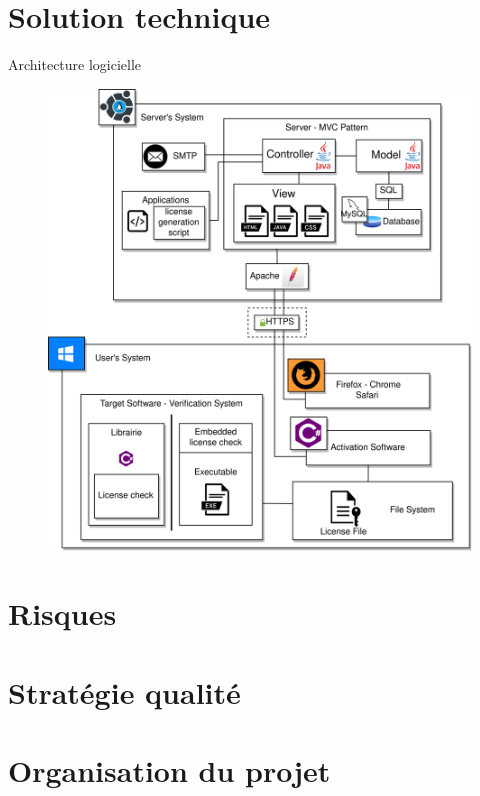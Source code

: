 \documentclass{cubeamer}
\begin{document}
\section{Solution technique}

\begin{frame}{Architecture logicielle}
    \begin{figure}
        \centering
        \includegraphics[scale=0.4]{img/DAT_general.png}
    \end{figure}
\end{frame}

\section{Risques}

\section{Stratégie qualité} %

\section{Organisation du projet} %
\end{document}
